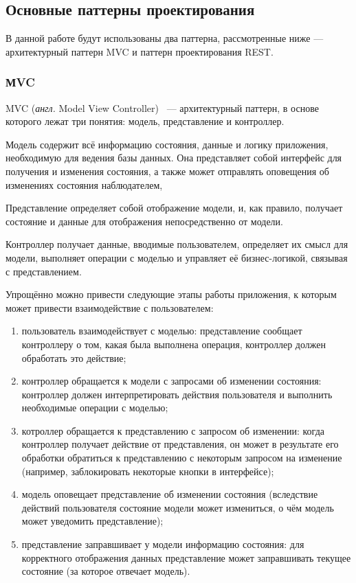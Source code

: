 \subsection{Основные паттерны проектирования}

В данной работе будут использованы два паттерна, рассмотренные ниже --- архитектурный паттерн MVC и паттерн проектирования REST.

\subsubsection{МVC}

MVC (\textit{англ.} Model View Controller)~\cite{mvc} --- архитектурный паттерн, в основе которого лежат  три понятия: модель, представление и контроллер.

Модель содержит всё информацию состояния, данные и логику приложения, необходимую для ведения базы данных.
Она представляет собой интерфейс для получения и изменения состояния, а также может отправлять оповещения об изменениях состояния наблюдателем, 

Представление определяет собой отображение модели, и, как правило, получает состояние и данные для отображения непосредственно от модели. 

Контроллер получает данные, вводимые пользователем, определяет их смысл для модели, выполняет операции с моделью и управляет её бизнес-логикой, связывая с представлением.
\clearpage

Упрощённо можно привести следующие этапы работы приложения, к которым может привести взаимодействие с пользователем:
\begin{enumerate}[label=\arabic*)]
	\item пользователь взаимодействует с моделью: представление сообщает контроллеру о том, какая была выполнена операция, контроллер должен обработать это действие;
	\item контроллер обращается к модели с запросами об изменении состояния: контроллер должен интерпретировать действия пользователя и выполнить необходимые операции с моделью;
	\item котроллер обращается к представлению с запросом об изменении: когда контроллер получает действие от представления, он может в результате его обработки обратиться к представлению с некоторым запросом на изменение (например, заблокировать некоторые кнопки в интерфейсе);
	\item модель оповещает представление об изменении состояния (вследствие действий пользователя состояние модели может измениться, о чём модель может уведомить представление);
	\item представление заправшивает у модели информацию состояния: для корректного отображения данных представление может заправшивать текущее состояние (за которое отвечает модель).
\end{enumerate}

